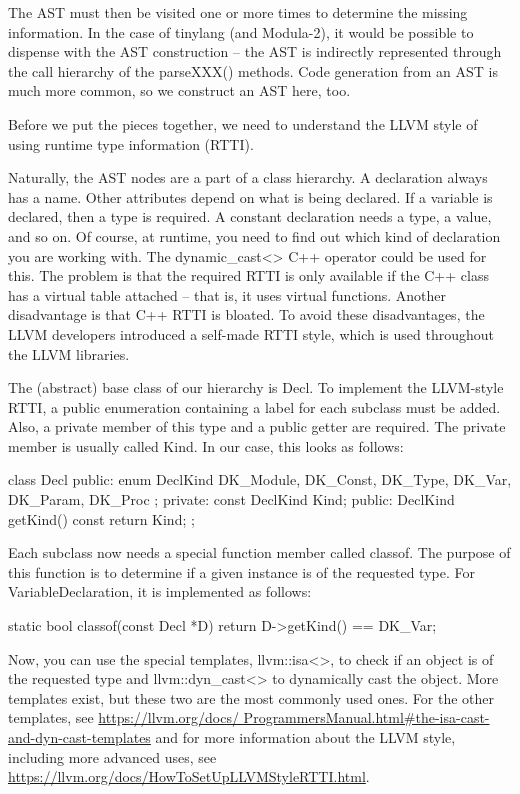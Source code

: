 The AST must then be visited one or more times to determine the missing information. In the case of tinylang (and Modula-2), it would be possible to dispense with the AST construction – the AST is indirectly represented through the call hierarchy of the parseXXX() methods. Code generation from an AST is much more common, so we construct an AST here, too.

Before we put the pieces together, we need to understand the LLVM style of using runtime type information (RTTI).


Naturally, the AST nodes are a part of a class hierarchy. A declaration always has a name. Other attributes depend on what is being declared. If a variable is declared, then a type is required. A constant declaration needs a type, a value, and so on. Of course, at runtime, you need to find out which kind of declaration you are working with. The dynamic\_cast<> C++ operator could be used for this. The problem is that the required RTTI is only available if the C++ class has a virtual table attached – that is, it uses virtual functions. Another disadvantage is that C++ RTTI is bloated. To avoid these disadvantages, the LLVM developers introduced a self-made RTTI style, which is used throughout the LLVM libraries.

The (abstract) base class of our hierarchy is Decl. To implement the LLVM-style RTTI, a public enumeration containing a label for each subclass must be added. Also, a private member of this type and a public getter are required. The private member is usually called Kind. In our case, this looks as follows:

\begin{cpp}
class Decl {
public:
    enum DeclKind { DK_Module, DK_Const, DK_Type,
        DK_Var, DK_Param, DK_Proc };
private:
    const DeclKind Kind;
public:
    DeclKind getKind() const { return Kind; }
};
\end{cpp}

Each subclass now needs a special function member called classof. The purpose of this function is to determine if a given instance is of the requested type. For VariableDeclaration, it is implemented as follows:

\begin{cpp}
static bool classof(const Decl *D) {
    return D->getKind() == DK_Var;
}
\end{cpp}

Now, you can use the special templates, llvm::isa<>, to check if an object is of the requested type and llvm::dyn\_cast<> to dynamically cast the object. More templates exist, but these two are the most commonly used ones. For the other templates, see \url{https://llvm.org/docs/ ProgrammersManual.html#the-isa-cast-and-dyn-cast-templates} and for more information about the LLVM style, including more advanced uses, see \url{https://llvm.org/docs/HowToSetUpLLVMStyleRTTI.html}.

